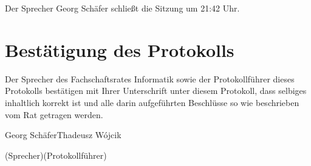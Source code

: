 \documentclass[a4paper, 11pt]{article} %
\newcommand{\TeXer}{Thadeusz W{\'o}jcik}
\newcommand{\fsiPresident}{Georg Schäfer}
\begin{document}
Der Sprecher Georg Schäfer schließt die Sitzung um 21:42 Uhr.

\pagebreak
\section{Bestätigung des Protokolls}
Der Sprecher des Fachschaftsrates Informatik sowie der Protokollführer dieses Protokolls bestätigen mit Ihrer Unterschrift unter diesem Protokoll, dass selbiges inhaltlich korrekt ist und alle darin aufgeführten Beschlüsse so wie beschrieben vom Rat getragen werden.
\\
\vspace{1.5cm}


\vspace{3.5cm}
\hrulefill \hfill \hrulefill

\fsiPresident \hfill \TeXer

{\footnotesize (Sprecher)\hfill (Protokollführer)}
\end{document}
